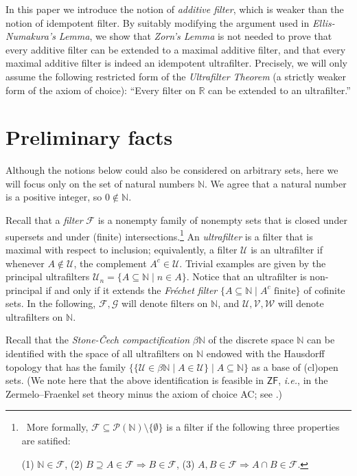\documentclass{amsart}
\theoremstyle{definition}
\theoremstyle{remark}
\def\F{\mathscr{F}}
\def\G{\mathscr{G}}
\def\PP{\mathcal{P}}
\def\U{\mathscr{U}}
\def\V{\mathscr{V}}
\def\W{\mathscr{W}}
\def\N{\mathbb{N}}
\def\R{\mathbb{R}}
\begin{document}
In this paper we introduce the notion of \emph{additive filter},
which is weaker than the notion of idempotent filter.
By suitably modifying the argument used in 
\emph{Ellis-Numakura's Lemma},
we show that \emph{Zorn's Lemma} is not needed to prove
that every additive filter can be extended to
a maximal additive filter, and that every maximal
additive filter is indeed an idempotent ultrafilter.
Precisely, we will only assume the following restricted form 
of the \emph{Ultrafilter Theorem} (a strictly weaker 
form of the axiom of choice):
``Every filter on $\R$ 
can be extended to an ultrafilter.''

\medskip
\section{Preliminary facts}

Although the notions below could also be considered
on arbitrary sets, here we will focus only on the set of 
natural numbers $\N$. We agree that a natural
number is a positive integer, so $0\not\in\N$. 

Recall that a \emph{filter} $\F$ is a nonempty family of nonempty sets
that is closed under supersets and under (finite) intersections.\footnote
{~More formally, $\F\subseteq\PP(\N)\setminus\{\emptyset\}$ is a filter if the following three properties
are satified: 

(1) $\N\in\F$, (2) $B\supseteq A\in\F\Rightarrow B\in\F$, (3)
$A,B\in\F\Rightarrow A\cap B\in\F$.}
An \emph{ultrafilter} is a filter that is maximal with respect to 
inclusion; equivalently, a filter $\U$ is an ultrafilter
if whenever $A\notin\U$, the complement $A^c\in\U$.
Trivial examples are given by the principal ultrafilters 
$\U_n=\{A\subseteq\N\mid n\in A\}$. Notice that an ultrafilter
is non-principal if and only if it extends the \emph{Fr\'echet filter}
$\{A\subseteq\N\mid A^c \text{ finite}\}$ of
cofinite sets. In the following,
$\F,\G$ will denote filters on $\N$, and $\U,\V,\W$
will denote ultrafilters on $\N$.

Recall that the \emph{Stone-\v{C}ech compactification} $\beta\N$
of the discrete space $\N$ can be identified
with the space of all ultrafilters on $\N$ endowed with the
Hausdorff topology that has the family
$\{\{\U\in\beta\N\mid A\in\U\}\mid A\subseteq\N\}$
as a base of (cl)open sets. (We note here that the above identification
is feasible in $\mathsf{ZF}$, \emph{i.e.}, in the Zermelo--Fraenkel set theory
minus the axiom of choice \textsf{AC}; see \cite[Theorems 14, 15]{hk}.)
\end{document}
